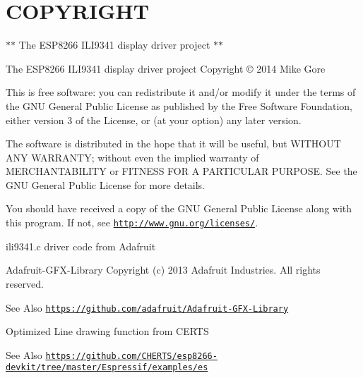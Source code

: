 \hypertarget{md_COPYRIGHT_COPYRIGHT}{}\section{C\-O\-P\-Y\-R\-I\-G\-H\-T}\label{md_COPYRIGHT_COPYRIGHT}
$\ast$$\ast$ The E\-S\-P8266 I\-L\-I9341 display driver project $\ast$$\ast$

\begin{DoxyParagraph}{The E\-S\-P8266 I\-L\-I9341 display driver project Copyright \copyright{} 2014 Mike Gore}

\end{DoxyParagraph}
This is free software\-: you can redistribute it and/or modify it under the terms of the G\-N\-U General Public License as published by the Free Software Foundation, either version 3 of the License, or (at your option) any later version.

The software is distributed in the hope that it will be useful, but W\-I\-T\-H\-O\-U\-T A\-N\-Y W\-A\-R\-R\-A\-N\-T\-Y; without even the implied warranty of M\-E\-R\-C\-H\-A\-N\-T\-A\-B\-I\-L\-I\-T\-Y or F\-I\-T\-N\-E\-S\-S F\-O\-R A P\-A\-R\-T\-I\-C\-U\-L\-A\-R P\-U\-R\-P\-O\-S\-E. See the G\-N\-U General Public License for more details.

You should have received a copy of the G\-N\-U General Public License along with this program. If not, see \href{http://www.gnu.org/licenses/}{\tt http\-://www.\-gnu.\-org/licenses/}.



 \begin{DoxyParagraph}{ili9341.c driver code from Adafruit}

\end{DoxyParagraph}
\begin{DoxyParagraph}{Adafruit-\/\-G\-F\-X-\/\-Library Copyright (c) 2013 Adafruit Industries. }
All rights reserved. 
\end{DoxyParagraph}
\begin{DoxySeeAlso}{See Also}
\href{https://github.com/adafruit/Adafruit-GFX-Library}{\tt https\-://github.\-com/adafruit/\-Adafruit-\/\-G\-F\-X-\/\-Library}
\end{DoxySeeAlso}




\begin{DoxyParagraph}{Optimized Line drawing function from C\-E\-R\-T\-S}

\end{DoxyParagraph}
\begin{DoxySeeAlso}{See Also}
\href{https://github.com/CHERTS/esp8266-devkit/tree/master/Espressif/examples/es}{\tt https\-://github.\-com/\-C\-H\-E\-R\-T\-S/esp8266-\/devkit/tree/master/\-Espressif/examples/es}
\end{DoxySeeAlso}


